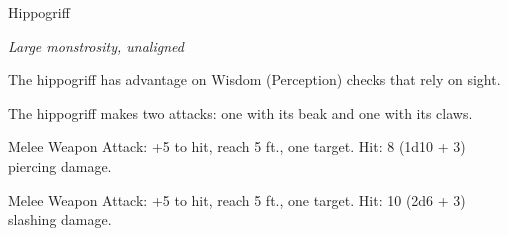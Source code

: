 \begin{monsterbox}{Hippogriff}
\begin{hangingpar}
\textit{Large monstrosity, unaligned}
\end{hangingpar}
\dndline%
\basics[%
armorclass = 11,
hitpoints = 3d10 + 3,
speed = {40 ft, fly 60 ft.}
]
\dndline%
\stats[%
STR = \stat{17},
DEX = \stat{13},
CON = \stat{13},
INT = \stat{2},
WIS = \stat{12},
CHA = \stat{8}
]
\dndline%
\details[%
skills={Perception +5, },
damageimmunities={},
savingthrows={},
conditionimmunities={},
damageresistances={},
damagevulnerabilities={},
senses={passive Perception 15},
challenge=1
]
\dndline%
\begin{monsteraction}
The hippogriff has advantage on Wisdom (Perception) checks that rely on sight.
\end{monsteraction}
\begin{monsteraction}[Multiattack]
The hippogriff makes two attacks: one with its beak and one with its claws.
\end{monsteraction}
\begin{monsteraction}[Beak]
Melee Weapon Attack: +5 to hit, reach 5 ft., one target. Hit: 8 (1d10 + 3) piercing damage.
\end{monsteraction}
\begin{monsteraction}[Claws]
Melee Weapon Attack: +5 to hit, reach 5 ft., one target. Hit: 10 (2d6 + 3) slashing damage.
\end{monsteraction}
\end{monsterbox}